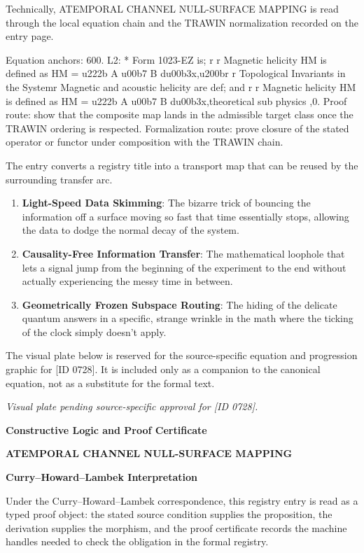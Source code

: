Technically, ATEMPORAL CHANNEL NULL-SURFACE MAPPING is read through the local equation chain and the TRAWIN normalization recorded on the entry page.

Equation anchors: 600. L2: * Form 1023-EZ is; r r Magnetic helicity HM is defined as HM = u222b A u00b7 B du00b3x,u200br r Topological Invariants in the Systemr Magnetic and acoustic helicity are def; and r r Magnetic helicity HM is defined as HM = u222b A u00b7 B du00b3x,theoretical sub physics ,0. Proof route: show that the composite map lands in the admissible target class once the TRAWIN ordering is respected. Formalization route: prove closure of the stated operator or functor under composition with the TRAWIN chain.

The entry converts a registry title into a transport map that can be reused by the surrounding transfer arc.
\endgroup

\begin{enumerate}[leftmargin=1.6em,itemsep=6pt,topsep=4pt]
\item \textbf{Light-Speed Data Skimming}: The bizarre trick of bouncing the information off a surface moving so fast that time essentially stops, allowing the data to dodge the normal decay of the system.
\item \textbf{Causality-Free Information Transfer}: The mathematical loophole that lets a signal jump from the beginning of the experiment to the end without actually experiencing the messy time in between.
\item \textbf{Geometrically Frozen Subspace Routing}: The hiding of the delicate quantum answers in a specific, strange wrinkle in the math where the ticking of the clock simply doesn't apply.
\end{enumerate}

\begingroup\footnotesize\sloppy
The visual plate below is reserved for the source-specific equation and progression graphic for [ID 0728]. It is included only as a companion to the canonical equation, not as a substitute for the formal text.
\par\endgroup
\begingroup\footnotesize\itshape
Visual plate pending source-specific approval for [ID 0728].
\par\endgroup

\clearpage
\begingroup\tzpsupportsetup
\noindent\textbf{\fontsize{10.8pt}{12.8pt}\selectfont [ID 0728] Constructive Logic and Proof Certificate}\par
\noindent\textbf{\fontsize{10pt}{12pt}\selectfont ATEMPORAL CHANNEL NULL-SURFACE MAPPING}\par
\vspace{0.45em}
\begingroup
\footnotesize
\setlength{\parskip}{0.22em}
\setlength{\parindent}{0pt}
\noindent\textbf{Curry--Howard--Lambek Interpretation}\par
Under the Curry--Howard--Lambek correspondence, this registry entry is read as a typed proof
object: the stated source condition supplies the proposition, the derivation supplies the
morphism, and the proof certificate records the machine handles needed to check the obligation
in the formal registry.

